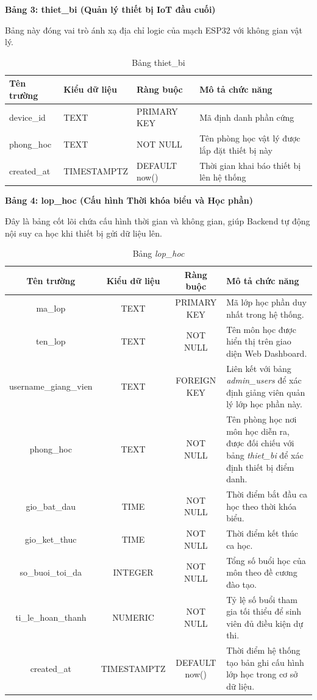\documentclass[12pt,a4paper]{report}
\renewcommand{\arraystretch}{1.3}
\begin{document}
\textbf{Bảng 3: thiet\_bi (Quản lý thiết bị IoT đầu cuối)}

Bảng này đóng vai trò ánh xạ địa chỉ logic của mạch ESP32 với không gian vật lý.

\begin{table}[H]
\centering
\caption{Bảng thiet\_bi}
\begin{tabularx}{\textwidth}{|l|l|l|X|}
\hline
\textbf{Tên trường} & \textbf{Kiểu dữ liệu} & \textbf{Ràng buộc} & \textbf{Mô tả chức năng} \\ \hline
device\_id & TEXT & PRIMARY KEY & Mã định danh phần cứng \\ \hline
phong\_hoc & TEXT & NOT NULL & Tên phòng học vật lý được lắp đặt thiết bị này \\ \hline
created\_at & TIMESTAMPTZ & DEFAULT now() & Thời gian khai báo thiết bị lên hệ thống \\ \hline
\end{tabularx}
\end{table}

\textbf{Bảng 4: lop\_hoc (Cấu hình Thời khóa biểu và Học phần)}

Đây là bảng cốt lõi chứa cấu hình thời gian và không gian, giúp Backend tự động nội suy ca học khi thiết bị gửi dữ liệu lên.

\begin{table}[H]
\centering
\renewcommand{\arraystretch}{1.3}
\caption{Bảng \textit{lop\_hoc}}
\begin{tabularx}{\textwidth}{|c|c|c|X|}
\hline
\textbf{Tên trường} & \textbf{Kiểu dữ liệu} & \textbf{Ràng buộc} & \textbf{Mô tả chức năng} \\ 
\hline
ma\_lop & TEXT & PRIMARY KEY & Mã lớp học phần duy nhất trong hệ thống. \\ 
\hline
ten\_lop & TEXT & NOT NULL & Tên môn học được hiển thị trên giao diện Web Dashboard. \\ 
\hline
username\_giang\_vien & TEXT & FOREIGN KEY & Liên kết với bảng \textit{admin\_users} để xác định giảng viên quản lý lớp học phần này. \\ 
\hline
phong\_hoc & TEXT & NOT NULL & Tên phòng học nơi môn học diễn ra, được đối chiếu với bảng \textit{thiet\_bi} để xác định thiết bị điểm danh. \\ 
\hline
gio\_bat\_dau & TIME & NOT NULL & Thời điểm bắt đầu ca học theo thời khóa biểu. \\ 
\hline
gio\_ket\_thuc & TIME & NOT NULL & Thời điểm kết thúc ca học. \\ 
\hline
so\_buoi\_toi\_da & INTEGER & NOT NULL & Tổng số buổi học của môn theo đề cương đào tạo. \\ 
\hline
ti\_le\_hoan\_thanh & NUMERIC & NOT NULL & Tỷ lệ số buổi tham gia tối thiểu để sinh viên đủ điều kiện dự thi. \\ 
\hline
created\_at & TIMESTAMPTZ & DEFAULT now() & Thời điểm hệ thống tạo bản ghi cấu hình lớp học trong cơ sở dữ liệu. \\ 
\hline
\end{tabularx}
\end{table}
\end{document}
